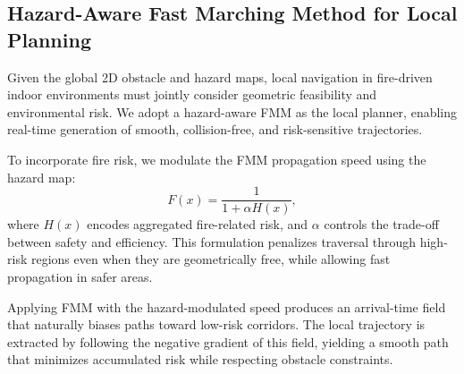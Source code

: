 \subsection{Hazard-Aware Fast Marching Method for Local Planning}

Given the global 2D obstacle and hazard maps, local navigation in fire-driven indoor environments must jointly consider geometric feasibility and environmental risk. We adopt a hazard-aware FMM as the local planner, enabling real-time generation of smooth, collision-free, and risk-sensitive trajectories.

To incorporate fire risk, we modulate the FMM propagation speed using the hazard map:
\begin{equation}
    F(x) = \frac{1}{1 + \alpha H(x)},
\end{equation}
where $H(x)$ encodes aggregated fire-related risk, and $\alpha$ controls the trade-off between safety and efficiency. This formulation penalizes traversal through high-risk regions even when they are geometrically free, while allowing fast propagation in safer areas. 

Applying FMM with the hazard-modulated speed produces an arrival-time field that naturally biases paths toward low-risk corridors. The local trajectory is extracted by following the negative gradient of this field, yielding a smooth path that minimizes accumulated risk while respecting obstacle constraints.








